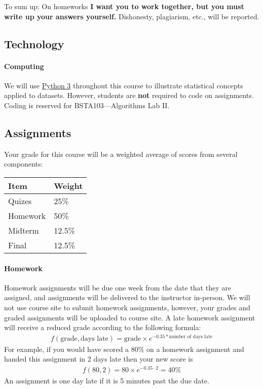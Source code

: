 \documentclass[11pt]{article}
\newcommand{\sub}[1]{
\hrulefill
\vspace{-5mm}
\subsection*{#1}
\vspace{-5mm}
\hrulefill
\vspace{-2.5mm}
}
\begin{document}
To sum up: On homeworks
\textbf{I want you to work together, but you must write up your answers yourself.}
Dishonesty, plagiarism, etc., will be reported.

\sub{Technology}

\paragraph{Computing}
We will use \href{https://www.python.org/}{Python 3} throughout this course to illustrate statistical concepts applied to datasets.
However, students are \textbf{not} required to code on assignments.
Coding is reserved for BSTA103---Algorithms Lab II. 

\sub{Assignments}

\vspace{1mm}
Your grade for this course will be a weighted average of scores from several components:

\begin{table}[ht!]
    \centering
    \begin{tabular}{ll}
        \hline
        Item & Weight \\
        \hline
        Quizes  \dotfill &  25\% \\
        Homework\dotfill & 50\% \\ 
        Midterm \dotfill&  12.5\%\\
        Final \dotfill& 12.5\% \\
        \hline
    \end{tabular}
\end{table}

\paragraph{Homework}

Homework assignments will be due one week from the date that they are assigned, and assignments will be delivered to the instructor in-person.
We will not use course site to submit homework assignments, however, your grades and graded assignments will be uploaded to course site.
A late homework assignment will receive a reduced grade according to the following formula: 
\begin{align*}
    f( \text{grade}, \text{days late} ) = \text{grade} \times e^{-0.35*\text{number of days late}} 
\end{align*}
For example, if you would have scored a 80\% on a homework assignment and handed this assignment in 2 days late then your new score is
\begin{align*}
   f(80,2) = 80 \times e^{-0.35 \cdot 2} = 40\% 
\end{align*}
An assignment is one day late if it is 5 minutes past the due date. 
\end{document}

